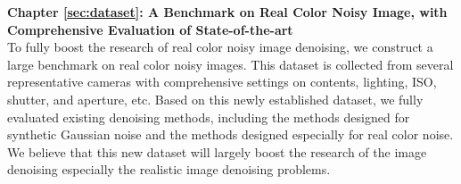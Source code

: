 \textbf{Chapter \ref{sec:dataset}: A Benchmark on Real Color Noisy Image, with Comprehensive Evaluation of State-of-the-art} \\[0.2em]

To fully boost the research of real color noisy image denoising, we construct a large benchmark on real color noisy images. This dataset is collected from several representative cameras with comprehensive settings on contents, lighting, ISO, shutter, and aperture, etc. Based on this newly established dataset, we fully evaluated existing denoising methods, including the methods designed for synthetic Gaussian noise and the methods designed especially for real color noise. We believe that this new dataset will largely boost the research of the image denoising especially the realistic image denoising problems.
















